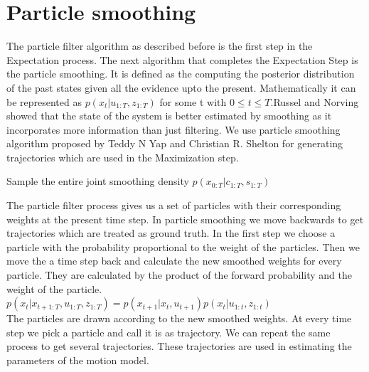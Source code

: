 \documentclass[12pt]{dalcsthesis}
\begin{document}
\section{Particle smoothing}
The particle filter algorithm as described before is the first step in the Expectation process. The next algorithm that completes the Expectation Step is the particle smoothing. It is defined as the computing the posterior distribution of the past states given all the evidence upto the present.
Mathematically it can be represented as $p(x _{t}|u _{1:T},z _{1:T})$ for some t with $ 0 \leq t \leq T$.Russel and Norving showed that the state of the system is better estimated by smoothing as it incorporates more information than just filtering.
We use particle smoothing algorithm proposed by Teddy N Yap and Christian R. Shelton for generating trajectories which are used in the Maximization step. 
\begin{algorithm}[H]
 \SetAlgoLined
  		 
	\caption{Sample the entire joint smoothing density $p(x_{0:T}|c_{1:T},s_{1:T})$}
	
\end{algorithm}

The particle filter process gives us a set of particles with their corresponding weights at the present time step. In particle smoothing we move backwards to get trajectories which are treated as ground truth. In the first step we choose a particle with the probability proportional to the weight of the particles. Then we move the a time step back and calculate the new smoothed weights for every particle. They are calculated by the product of the forward probability and the weight of the particle. 
\\
$ p(x_{t}|x_{t+1:T},u_{1:T},z_{1:T})=p(x_{t+1}|x_{t},u_{t+1})p(x_{t}|u_{1:t},z_{1:t})$
\\
The particles are drawn according to the new smoothed weights. At every time step we pick a particle and call it is as trajectory. We can repeat the same process to get several trajectories. These trajectories are used in estimating the parameters of the motion model.
 
\end{document}
